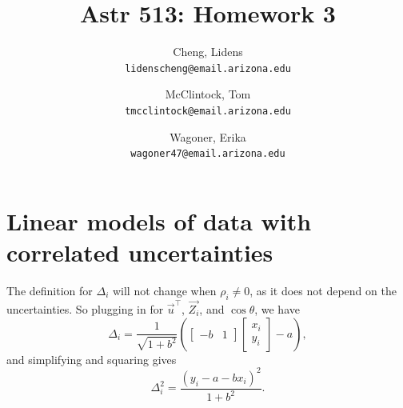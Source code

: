 \documentclass[12pt,a4paper]{article}
\author{
  Cheng, Lidens\\
  \texttt{lidenscheng@email.arizona.edu}
  \and
  McClintock, Tom\\
  \texttt{tmcclintock@email.arizona.edu}
  \and
  Wagoner, Erika\\
  \texttt{wagoner47@email.arizona.edu}
}
\title{Astr 513: Homework 3}
\begin{document}
\maketitle

\section{Linear models of data with correlated uncertainties}
The definition for $\Delta_i$ will not change when $\rho_i \neq 0$, as it does not depend on the uncertainties. So plugging in for $\vec{u}^\top$, $\vec{Z_i}$, and $\cos \theta$, we have
\begin{equation}
 \label{eqn:Delta}
 \Delta_i = \frac{1}{\sqrt{1 + b^2}} \left(\begin{bmatrix}-b & 1\end{bmatrix} \begin{bmatrix}x_i \\ y_i\end{bmatrix} - a\right),
\end{equation}
and simplifying and squaring gives
\begin{equation}
 \label{eqn:Delta2}
 \Delta_i^2 = \frac{\left(y_i - a - b x_i\right)^2}{1 + b^2}.
\end{equation}
\end{document}
